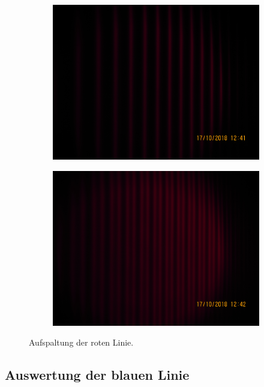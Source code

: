 \begin{figure}
\begin{subfigure}[c]{0.5\textwidth}
  \includegraphics[width=\textwidth]{Bild1.JPG}
\end{subfigure}
\begin{subfigure}[c]{0.5\textwidth}
  \includegraphics[width=\textwidth]{Bild2.JPG}
\end{subfigure}
\caption{Aufspaltung der roten Linie.}
\end{figure}


\subsection{Auswertung der blauen Linie}

